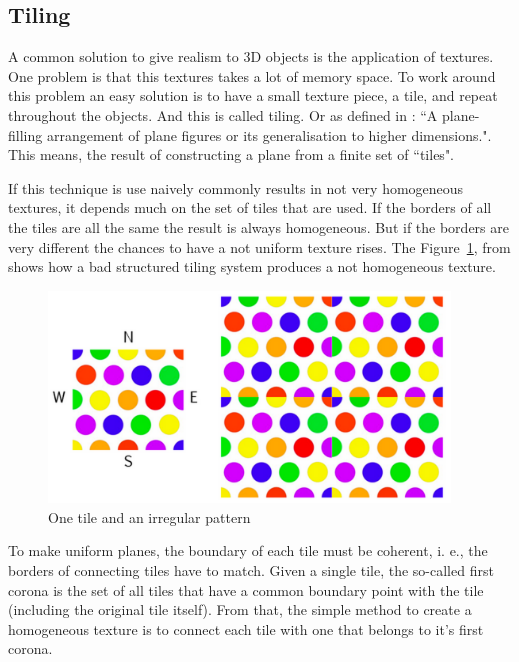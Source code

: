 
\subsection{Tiling} %
\label{ssub:tiling}

A common solution to give realism to 3D objects is the application of textures. One problem is that this textures takes a lot of memory space. To work around this problem an easy solution is to have a small texture piece, a tile, and repeat throughout the objects. And this is called tiling. Or as defined in \cite{TilingWOLFRAM}: ``A plane-filling arrangement of plane figures or its generalisation to higher dimensions.".  This means, the result of constructing a plane from a finite set of ``tiles". 

If this technique is use naively commonly results in not very homogeneous textures, it depends much on the set of tiles that are used. If the borders of all the tiles are all the same the result is always homogeneous. But if the borders are very different the chances to have a not uniform texture rises. The Figure~\ref{fig:TIrregulartexture}, from \cite{ProcWorld} shows how a bad structured tiling system produces a not homogeneous texture.  


\begin{figure}[htbp]
	\centering
	\includegraphics[width=0.95\textwidth]{img/Theory/Tiling/iregular.png}
	\caption{One tile and an irregular pattern}
	\label{fig:TIrregulartexture}
\end{figure}


To make uniform planes, the boundary of each tile must be coherent, i. e., the borders of connecting tiles have to match. Given a single tile, the so-called first corona is the set of all tiles that have a common boundary point with the tile (including the original tile itself). From that, the simple method to create a homogeneous texture is to connect each tile with one that belongs to it's first corona.

